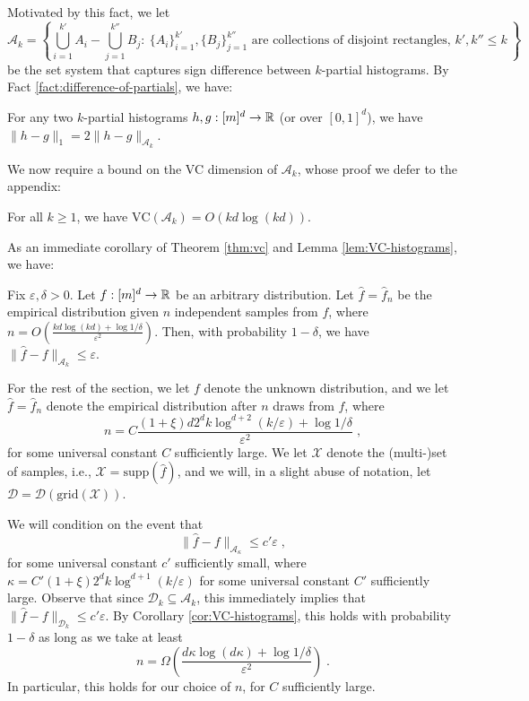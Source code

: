 \documentclass[final,12pt]{colt2018} %
\newcommand{\supp}{\mathrm{supp}}
\newcommand{\eps}{\varepsilon}
\newcommand{\hier}{\mathcal{D}}
\newcommand{\calX}{\mathcal{X}}
\newcommand{\fhat}{\widehat{f}}
\newcommand{\VC}{\mathrm{VC}}
\newcommand{\A}{\mathcal{A}}
\newcommand{\grid}{\mathrm{grid}}
\begin{document}
\noindent
Motivated by this fact, we let
\[
\A_k = \left\{ \bigcup_{i = 1}^{k'} A_i - \bigcup_{j = 1}^{k''} B_j : ~\mbox{$\{ A_i \}_{i = 1}^{k'}, \{ B_j \}_{j = 1}^{k''}
$ are collections of disjoint rectangles, $k', k'' \leq k$}~ \right\} \; 
\] 
be the set system that captures sign difference between $k$-partial histograms.
By Fact \ref{fact:difference-of-partials}, we have:
\begin{corollary}
For any two $k$-partial histograms $h, g: [m]^d \to \operatorname{\mathbb{R}}$ (or over $[0, 1]^d$), we have
$
\| h - g \|_1 = 2 \| h - g \|_{\A_k}.$
\end{corollary}
\noindent
We now require a bound on the VC dimension of $\A_k$, whose proof we defer to the appendix:
\begin{lemma}
\label{lem:VC-histograms}
For all $k \geq 1$, we have $\VC (\A_k) = O(k d \log (k d))$.
\end{lemma}

\noindent
As an immediate corollary of Theorem \ref{thm:vc} and Lemma \ref{lem:VC-histograms}, we have:
\begin{corollary}
\label{cor:VC-histograms}
Fix $\eps, \delta > 0$.
Let $f:[m]^d \to \operatorname{\mathbb{R}}$ be an arbitrary distribution.
Let $\fhat = \fhat_n$ be the empirical distribution given $n$ independent samples from $f$, where
$
n = O \left( \frac{k d \log (k d) + \log 1 / \delta}{\eps^2} \right)$.
Then, with probability $1 - \delta$, we have
$\| \fhat - f \|_{\A_k} \leq \eps$.

\end{corollary}
\noindent

\noindent
For the rest of the section, we let $f$ denote the unknown distribution, and we let $\fhat = \fhat_n$ denote the empirical distribution after $n$ draws from $f$, where 
\[
n =  C \frac{(1 + \xi) d 2^d k \log^{d + 2} (k / \eps) + \log 1 / \delta}{\eps^2} \; ,
\]
for some universal constant $C$ sufficiently large.
We let $\calX$ denote the (multi-)set of samples, 
i.e., $\calX = \supp (\fhat)$, and we will, in a slight abuse of notation, let $\hier = \hier (\grid (\calX))$.

We will condition on the event that
\begin{equation}
\label{eq:deterministic-cond}
\| \fhat - f \|_{\A_{\kappa}} \leq c' \eps \; ,
\end{equation}
for some universal constant $c'$ sufficiently small, where $\kappa = C' (1 + \xi) 2^d k \log^{d + 1} (k / \eps)$ 
for some universal constant $C'$ sufficiently large.
Observe that since $\hier_k \subseteq \A_k$, this immediately implies that 
$
\| \fhat - f \|_{\hier_k} \leq c' \eps$.
By Corollary \ref{cor:VC-histograms}, this holds with probability $1 - \delta$ as long as we take at least
\[
n = \Omega \left( \frac{d \kappa \log (d \kappa) + \log 1 / \delta}{\eps^2} \right) \; .
\]
In particular, this holds for our choice of $n$, for $C$ sufficiently large.
\end{document}
